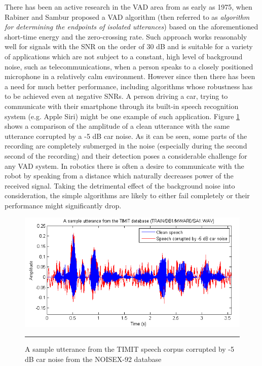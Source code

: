 There has been an active research in the VAD area from as early as 1975, when Rabiner and Sambur \cite{RabinerSambur} proposed a VAD algorithm (then referred to as \emph{algorithm for determining the endpoints of isolated utterances}) based on the aforementioned short-time energy and the zero-crossing rate. Such approach works reasonably well for signals with the SNR on the order of 30 dB and is suitable for a variety of applications which are not subject to a constant, high level of background noise, such as telecommunications, when a person speaks to a closely positioned microphone in a relatively calm environment. However since then there has been a need for much better performance, including algorithms whose robustness has to be achieved even at negative SNRs. A person driving a car, trying to communicate with their smartphone through its built-in speech recognition system (e.g. Apple Siri) might be one example of such application. Figure \ref{fig:corruptedSpeech} shows a comparison of the amplitude of a clean utterance with the same utterance corrupted by a -5 dB car noise. As it can be seen, some parts of the recording are completely submerged in the noise (especially during the second second of the recording) and their detection poses a considerable challenge for any VAD system. In robotics there is often a desire to communicate with the robot by speaking from a distance which naturally decreases power of the received signal. Taking the detrimental effect of the background noise into consideration, the simple algorithms are likely to either fail completely or their performance might significantly drop.

\begin{figure}[htbp]
	\centering
		\includegraphics[width=0.9\columnwidth]{Figures/corruptedSpeech.png}
		\rule{37em}{0.5pt}
	\caption[A sample utterance corrupted by -5 dB car noise]{A sample utterance from the TIMIT \cite{TIMIT} speech corpus corrupted by -5 dB car noise from the NOISEX-92 \cite{NOISEX} database}
	\label{fig:corruptedSpeech}
\end{figure}

